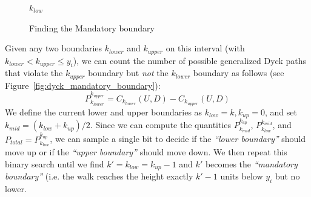 \begin{figure}
\vspace{-2.5em}
\begin{framed}
    \renewcommand\figurename{Algorithm}
    \caption{Finding the Mandatory boundary}
    \label{alg:mandatory_boundary}
    \begin{algorithmic}[1]
                \vspace{.3em}
                \vspace{.3em}
                \vspace{.3em}
                \vspace{.3em}
            \EndWhile
            \State \Return $k_{low}$
        \EndFunction
    \end{algorithmic}
\end{framed}
\end{figure}
Given any two boundaries $k_{lower}$ and $k_{upper}$ on this interval (with $k_{lower} < k_{upper} \le y_i$),
we can count the number of possible generalized Dyck paths that violate the $k_{upper}$ boundary but \emph{not} the $k_{lower}$ boundary as follows
(see Figure~\ref{fig:dyck_mandatory_boundary}):
\[
P_{k_{lower}}^{k_{upper}} = C_{k_{lower}}(U,D) - C_{k_{upper}}(U,D)
\]
We define the current lower and upper boundaries as $k_{low} = k, k_{up} = 0$, and set $k_{mid} = (k_{low} + k_{up})/2$.
Since we can compute the quantities $P_{k_{mid}}^{k_{up}}$, $P_{k_{low}}^{k_{mid}}$, and $P_{total} = P_{k_{low}}^{k_{up}}$,
we can sample a single bit to decide if the \emph{``lower boundary''} should move up or if the \emph{``upper boundary''} should move down.
We then repeat this binary search until we find $k' = k_{low} = k_{up}-1$ and $k'$ becomes the \emph{``mandatory boundary''}
(i.e. the walk reaches the height exactly $k'-1$ units below $y_i$ but no lower.
